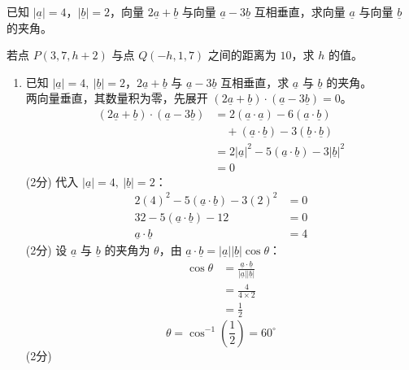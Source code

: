 \documentclass[12pt,a4paper]{exam-zh}
\newcommand{\qscore}[1]{%
    \unskip\nobreak\hfill
    \makebox[0pt][l]{\makebox[4em][r]{(#1\%)}}%
}
\newcommand{\solutionlayout}{%
    \setlength{\abovedisplayskip}{0.6em}%
    \setlength{\belowdisplayskip}{0.6em}%
    \setlength{\abovedisplayshortskip}{0.35em}%
    \setlength{\belowdisplayshortskip}{0.35em}%
    \setlength{\jot}{0.35em}%
}
\begin{document}
\begin{question}[points = 12]
    \begin{questionparts}
        \item 已知 $|\underline{a}|=4$，$|\underline{b}|=2$，向量 $2\underline{a}+\underline{b}$ 与向量 $\underline{a}-3\underline{b}$ 互相垂直，求向量 $\underline{a}$ 与向量 $\underline{b}$ 的夹角。 \qscore{7}

        \item 若点 $P(3,7,h+2)$ 与点 $Q(-h,1,7)$ 之间的距离为 $10$，求 $h$ 的值。 \qscore{5}
    \end{questionparts}
\end{question}

\begin{solution}
    \solutionlayout
    \begin{enumerate}[label=(\alph*),leftmargin=2.4em,itemsep=1em,topsep=0.5em,parsep=0.25em]
        \item 已知 $|\underline{a}|=4,\ |\underline{b}|=2$，$2\underline{a}+\underline{b}$ 与 $\underline{a}-3\underline{b}$ 互相垂直，求 $\underline{a}$ 与 $\underline{b}$ 的夹角。 \\
        两向量垂直，其数量积为零，先展开 $(2\underline{a}+\underline{b})\cdot(\underline{a}-3\underline{b})=0$。
        \begin{align*}
            (2\underline{a}+\underline{b})\cdot(\underline{a}-3\underline{b})
            &= 2(\underline{a}\cdot\underline{a})-6(\underline{a}\cdot\underline{b}) \\
            &\quad +(\underline{a}\cdot\underline{b})-3(\underline{b}\cdot\underline{b}) \\
            &= 2|\underline{a}|^2 - 5(\underline{a}\cdot\underline{b}) - 3|\underline{b}|^2 \\
            &= 0
        \end{align*}
        \hfill (2分)
        代入 $|\underline{a}|=4,\ |\underline{b}|=2$：
        \begin{align*}
            2(4)^2 - 5(\underline{a}\cdot\underline{b}) - 3(2)^2 &= 0 \\
            32 - 5(\underline{a}\cdot\underline{b}) - 12 &= 0 \\
            \underline{a}\cdot\underline{b} &= 4
        \end{align*}
        \hfill (2分)
        设 $\underline{a}$ 与 $\underline{b}$ 的夹角为 $\theta$，由 $\underline{a}\cdot\underline{b}=|\underline{a}||\underline{b}|\cos\theta$：
        \begin{align*}
            \cos\theta &= \frac{\underline{a}\cdot\underline{b}}{|\underline{a}||\underline{b}|} \\
            &= \frac{4}{4\times2} \\
            &= \frac{1}{2}
        \end{align*}
        \[
            \theta = \cos^{-1}\left(\frac{1}{2}\right) = 60^\circ
        \]
        \hfill (2分)


\end{enumerate}
\end{solution}
\end{document}
